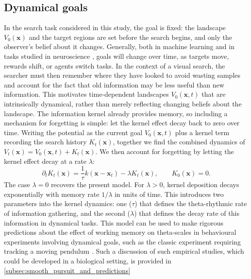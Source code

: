 \subsection{Dynamical goals}\label{subsec:dynamical_goals}
In the search task considered in this study, the goal is fixed: the landscape $V_0(\mathbf{x})$ and the target regions are set before the search begins, and only the observer's belief about it changes. Generally, both in machine learning \cite{cranmer_advances_2023, bremer_predicting_2021} and in tasks studied in neuroscience \cite{tan_theta_2024, Gherri2011-wl}, goals will change over time, as targets move, rewards shift, or agents switch tasks. In the context of a visual search, the searcher must then remember where they have looked to avoid wasting samples and account for the fact that old information may be less useful than new information. This motivates time-dependent landscapes $V_0(\mathbf{x}, t)$ that are intrinsically dynamical, rather than merely reflecting changing beliefs about the landscape. The information kernel already provides memory, so including a mechanism for forgetting is simple: let the kernel effect decay back to zero over time. Writing the potential as the current goal $V_0(\mathbf{x}, t)$ plus a kernel term recording the search history $K_t(\mathbf{x})$, together we find the combined dynamics of $V_t(\mathbf{x}) = V_0(\mathbf{x}, t) + K_t(\mathbf{x})$. We then account for forgetting by letting the kernel effect decay at a rate $\lambda$:
\begin{equation}
	\partial_t K_t(\mathbf{x}) = \frac{1}{\tau}k(\mathbf{x} - \mathbf{x}_t) - \lambda K_t(\mathbf{x}), \qquad K_0(\mathbf{x}) = 0.
\end{equation}
The case $\lambda = 0$ recovers the present model. For $\lambda > 0$, kernel deposition decays exponentially with memory rate $1/\lambda$ in units of time. This introduces two parameters into the kernel dynamics: one ($\tau$) that defines the theta-rhythmic rate of information gathering, and the second ($\lambda$) that defines the decay rate of this information in dynamical tasks. This model can be used to make rigorous predictions about the effect of working memory on theta-scales in behavioural experiments involving dynamical goals, such as the classic experiment requiring tracking a moving pendulum \cite{law_eye-tracking_1973}. Such a discussion of such empirical studies, which could be developed in a biological setting, is provided in \cref{subsec:smooth_pursuit_and_predictions}

